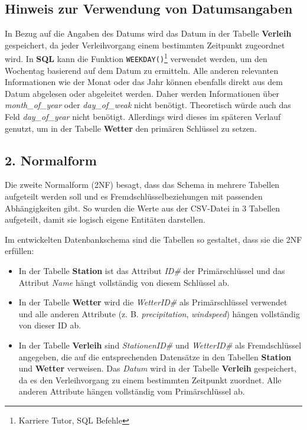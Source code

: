 \documentclass{article}
\begin{document}
\subsection*{Hinweis zur Verwendung von Datumsangaben}

In Bezug auf die Angaben des Datums wird das Datum in der Tabelle \textbf{Verleih} gespeichert, da jeder Verleihvorgang einem bestimmten Zeitpunkt zugeordnet wird. In \textbf{SQL} kann die Funktion \texttt{WEEKDAY()}\footnote{Karriere Tutor, SQL Befehle\cite{karrieretutor_sql}} verwendet werden, um den Wochentag basierend auf dem Datum zu ermitteln. Alle anderen relevanten Informationen wie der Monat oder das Jahr können ebenfalls direkt aus dem Datum abgelesen oder abgeleitet werden. Daher werden Informationen über \textit{month\_of\_year} oder \textit{day\_of\_weak} nicht benötigt. Theoretisch würde auch das Feld  \textit{day\_of\_year} nicht benötigt. Allerdings wird dieses im späteren Verlauf genutzt, um in der Tabelle \textbf{Wetter} den primären Schlüssel zu setzen.

\subsection*{2. Normalform}

Die zweite Normalform (2NF) besagt, dass das Schema in mehrere Tabellen aufgeteilt werden soll und es Fremdschlüsselbeziehungen mit passenden Abhängigkeiten gibt.
So wurden die Werte aus der CSV-Datei in 3 Tabellen aufgeteilt, damit sie logisch eigene Entitäten darstellen.


Im entwickelten Datenbankschema sind die Tabellen so gestaltet, dass sie die 2NF erfüllen:
\begin{itemize}
    \item In der Tabelle \textbf{Station} ist das Attribut \textit{ID\#} der Primärschlüssel und das Attribut \textit{Name} hängt vollständig von diesem Schlüssel ab.
    \item In der Tabelle \textbf{Wetter} wird die \textit{WetterID\#} als Primärschlüssel verwendet und alle anderen Attribute (z. B. \textit{precipitation}, \textit{windspeed}) hängen vollständig von dieser ID ab.
    \item  In der Tabelle \textbf{Verleih} sind \textit{StationenID\#} und \textit{WetterID\#} als Fremdschlüssel angegeben, die auf die entsprechenden Datensätze in den Tabellen \textbf{Station} und \textbf{Wetter} verweisen. Das \textit{Datum} wird in der Tabelle \textbf{Verleih} gespeichert, da es den Verleihvorgang zu einem bestimmten Zeitpunkt zuordnet. Alle anderen Attribute hängen vollständig vom Primärschlüssel ab.
\end{itemize}
\end{document}
